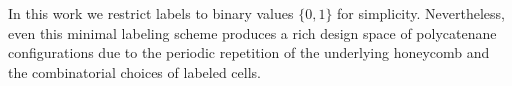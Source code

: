 \documentclass[times,twocolumn,final]{elsarticle}
\begin{document}
In this work we restrict labels to binary values $\{0,1\}$ for simplicity.
Nevertheless, even this minimal labeling scheme produces a rich design
space of polycatenane configurations due to the periodic repetition of the
underlying honeycomb and the combinatorial choices of labeled cells.






\end{document}
